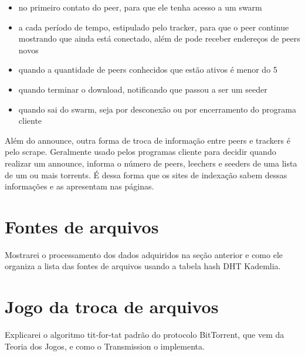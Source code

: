 \begin{itemize}
    \item no primeiro contato do \gls*{peer}, para que ele tenha acesso a um
        \gls*{swarm}

    \item a cada período de tempo, estipulado pelo tracker, para que o \gls*{peer}
        continue mostrando que ainda está conectado, além de pode receber endereços de
        \glspl*{peer} novos

    \item quando a quantidade de \glspl*{peer} conhecidos que estão ativos é menor do 5

    \item quando terminar o download, notificando que passou a ser um \gls*{seeder}

    \item quando sai do \gls*{swarm}, seja por desconexão ou por encerramento do
        programa cliente
\end{itemize}

Além do \gls*{announce}, outra forma de troca de informação entre \glspl*{peer} e
\glspl*{tracker} é pelo \gls{scrape}. Geralmente usado pelos programas cliente para
decidir quando realizar um \gls*{announce}, informa o número de \glspl*{peer},
\glspl*{leecher} e \glspl*{seeder} de uma lista de um ou mais \glspl*{torrent}. É dessa
forma que os sites de indexação sabem dessas informações e as apresentam nas páginas.


\section{Fontes de arquivos}

Mostrarei o processamento dos dados adquiridos na seção anterior e como ele organiza a lista das fontes de arquivos usando a tabela hash DHT Kademlia.

\section{Jogo da troca de arquivos}
\label{titfortat}

Explicarei o algoritmo tit-for-tat padrão do protocolo BitTorrent, que vem da Teoria dos Jogos, e como o Transmission o implementa.

\afterpage{\clearpage}